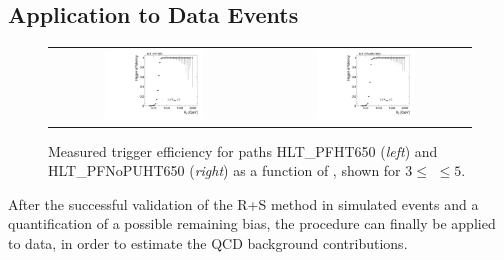 \subsection{Application to Data Events}
\label{subsec:validation_data_R+S}
\begin{figure}[!t]
  \centering
  \begin{tabular}{cc}
                \includegraphics[width=0.49\textwidth]{figures/turn_on_HT_TagEle27WP80_ProbePFHT650_chs_NJets3-5.pdf} &
                \includegraphics[width=0.49\textwidth]{figures/turn_on_HT_TagEle27WP80_ProbePFNoPUHT650_chs_NJets3-5.pdf} \\
  \end{tabular}
\caption{Measured trigger efficiency for paths HLT\_PFHT650 (\textit{left}) and HLT\_PFNoPUHT650 (\textit{right}) as a function of \HT, shown for $3 \leq$ \NJets $\leq 5$.} 
  \label{fig:trig_eff_650_3njets5}
\end{figure}
After the successful validation of the R+S method in simulated events and a quantification of a possible remaining bias, the procedure can finally be applied to data, in order to estimate the QCD background contributions. \\

